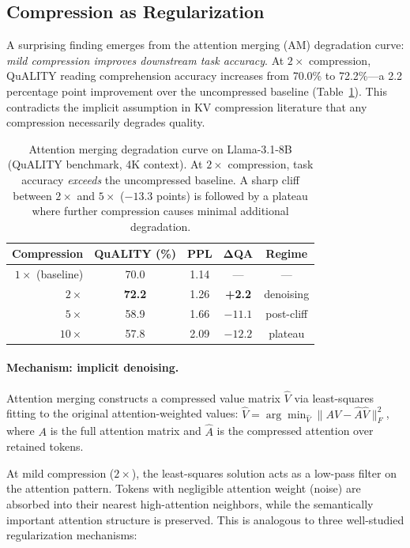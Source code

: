 \subsection{Compression as Regularization}
\label{sec:compression-reg}

A surprising finding emerges from the attention merging (AM) degradation curve: \emph{mild compression improves downstream task accuracy}. At $2\times$ compression, QuALITY reading comprehension accuracy increases from 70.0\% to 72.2\%---a 2.2 percentage point improvement over the uncompressed baseline (Table~\ref{tab:am-curve}). This contradicts the implicit assumption in KV compression literature that any compression necessarily degrades quality.

\begin{table}[h]
\centering
\begin{tabular}{rcccc}
\toprule
\textbf{Compression} & \textbf{QuALITY (\%)} & \textbf{PPL} & $\boldsymbol{\Delta}$\textbf{QA} & \textbf{Regime} \\
\midrule
$1\times$ (baseline) & 70.0 & 1.14 & --- & --- \\
$2\times$ & \textbf{72.2} & 1.26 & \textbf{+2.2} & denoising \\
$5\times$ & 58.9 & 1.66 & $-11.1$ & post-cliff \\
$10\times$ & 57.8 & 2.09 & $-12.2$ & plateau \\
\bottomrule
\end{tabular}
\caption{Attention merging degradation curve on Llama-3.1-8B (QuALITY benchmark, 4K context). At $2\times$ compression, task accuracy \emph{exceeds} the uncompressed baseline. A sharp cliff between $2\times$ and $5\times$ ($-13.3$ points) is followed by a plateau where further compression causes minimal additional degradation.}
\label{tab:am-curve}
\end{table}

\paragraph{Mechanism: implicit denoising.}
Attention merging constructs a compressed value matrix $\hat{V}$ via least-squares fitting to the original attention-weighted values: $\hat{V} = \arg\min_{\hat{V}} \|AV - \hat{A}\hat{V}\|_F^2$, where $A$ is the full attention matrix and $\hat{A}$ is the compressed attention over retained tokens.

At mild compression ($2\times$), the least-squares solution acts as a low-pass filter on the attention pattern. Tokens with negligible attention weight (noise) are absorbed into their nearest high-attention neighbors, while the semantically important attention structure is preserved. This is analogous to three well-studied regularization mechanisms:

